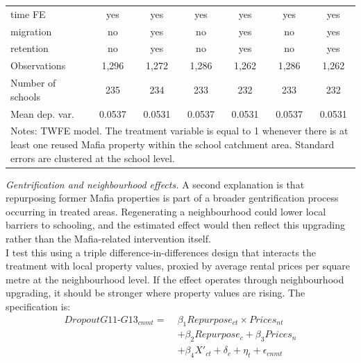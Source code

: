 \documentclass[12pt]{article}
\theoremstyle{plain}
\theoremstyle{plain}
\theoremstyle{plain}
\theoremstyle{definition}
\theoremstyle{plain}
\theoremstyle{definition}
\theoremstyle{plain}
\theoremstyle{remark}
\theoremstyle{definition}
\theoremstyle{definition}
\theoremstyle{plain}
\begin{document}
\begin{table}[H]
{\begin{tabular}{p{7.39em}llllll}
			\multicolumn{1}{l}{time FE} & \multicolumn{1}{c}{yes} & \multicolumn{1}{c}{yes} & \multicolumn{1}{c}{yes} & \multicolumn{1}{c}{yes} & \multicolumn{1}{c}{yes} & \multicolumn{1}{c}{yes} \\
			\multicolumn{1}{l}{migration} & \multicolumn{1}{c}{no} & \multicolumn{1}{c}{yes} & \multicolumn{1}{c}{no} & \multicolumn{1}{c}{yes} & \multicolumn{1}{c}{no} & \multicolumn{1}{c}{yes} \\
			\multicolumn{1}{l}{retention} & \multicolumn{1}{c}{no} & \multicolumn{1}{c}{yes} & \multicolumn{1}{c}{no} & \multicolumn{1}{c}{yes} & \multicolumn{1}{c}{no} & \multicolumn{1}{c}{yes} \\
			\multicolumn{1}{l}{Observations} & \multicolumn{1}{c}{1,296} & \multicolumn{1}{c}{1,272} & \multicolumn{1}{c}{1,286} & \multicolumn{1}{c}{1,262} & \multicolumn{1}{c}{1,286} & \multicolumn{1}{c}{1,262} \\
			\multicolumn{1}{l}{Number of schools} & \multicolumn{1}{c}{235} & \multicolumn{1}{c}{234} & \multicolumn{1}{c}{233} & \multicolumn{1}{c}{232} & \multicolumn{1}{c}{233} & \multicolumn{1}{c}{232} \\
			\multicolumn{1}{l}{Mean dep. var.} & \multicolumn{1}{c}{0.0537} & \multicolumn{1}{c}{0.0531} & \multicolumn{1}{c}{0.0537} & \multicolumn{1}{c}{0.0531} & \multicolumn{1}{c}{0.0537} & \multicolumn{1}{c}{0.0531} \\
			\midrule
			\multicolumn{7}{p{37.39em}}{Notes: TWFE model. The treatment variable is equal to 1 whenever there is at least one reused Mafia property within the school catchment area. Standard errors are clustered at the school level.} \\
		\end{tabular}%
	}
\end{table}

\emph{Gentrification and neighbourhood effects.} A second explanation is that repurposing former Mafia properties is part of a broader gentrification process occurring in treated areas. Regenerating a neighbourhood could lower local barriers to schooling, and the estimated effect would then reflect this upgrading rather than the Mafia-related intervention itself. \\
I test this using a triple difference-in-differences design that interacts the treatment with local property values, proxied by average rental prices per square metre at the neighbourhood level. If the effect operates through neighbourhood upgrading, it should be stronger where property values are rising. The specification is:
\begin{equation} \label{continuous_spec}
	\begin{aligned}
		DropoutG11\text{-}G13_{cnmt} =\; & \beta_1 Repurpose_{ct} \times Prices_{nt} \\
		& + \beta_2 Repurpose_{c} + \beta_3 Prices_{n} \\
		& + \beta_4 X'_{ct} + \delta_c + \eta_t + \epsilon_{cnmt}
	\end{aligned}
\end{equation}
\end{document}
